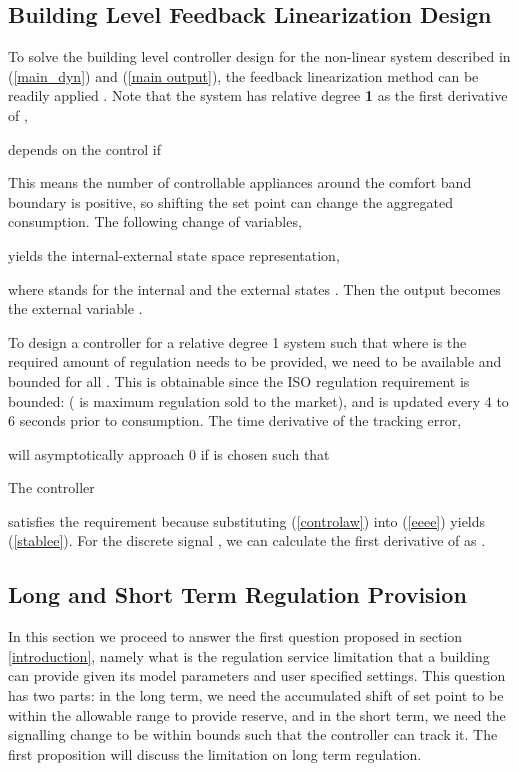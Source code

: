 \documentclass[journal]{IEEEtran}
\begin{document}
\subsection{Building Level Feedback Linearization Design}
To solve the building level controller design for the non-linear system described in (\ref{main_dyn}) and (\ref{main output}), the feedback linearization method can be readily applied \cite{khalil}. Note that the system has relative degree \textbf{1} as the first derivative of ,

depends on the control  if  

This means the number of controllable appliances around the comfort band boundary is positive, so shifting the set point can change the aggregated consumption. The following change of variables,

yields the internal-external state space representation,
 
where  stands for the internal and  the external states \cite{khalil}. Then the output becomes the external variable .

To design a controller for a relative degree 1 system such that  where  is the required amount of regulation needs to be provided, we need  to be available and bounded for all . This is obtainable since the ISO regulation requirement is bounded:  ( is maximum regulation sold to the market), and  is updated every 4 to 6 seconds prior to consumption. The time derivative of the tracking error,

will asymptotically approach 0 if  is chosen such that

The controller

satisfies the requirement because substituting (\ref{controlaw}) into (\ref{eeee}) yields (\ref{stablee}). For the discrete signal , we can calculate the first derivative of  as .

\subsection{Long and Short Term Regulation Provision}
In this section we proceed to answer the first question proposed in section \ref{introduction}, namely what is the regulation service limitation that a building can provide given its model parameters and user specified settings. This question has two parts:  in the long term, we need the accumulated shift of set point to be within the allowable range to provide reserve, and  in the short term, we need the signalling change to be within bounds such that the controller can track it. The first proposition will discuss the limitation on long term regulation.
\end{document}
